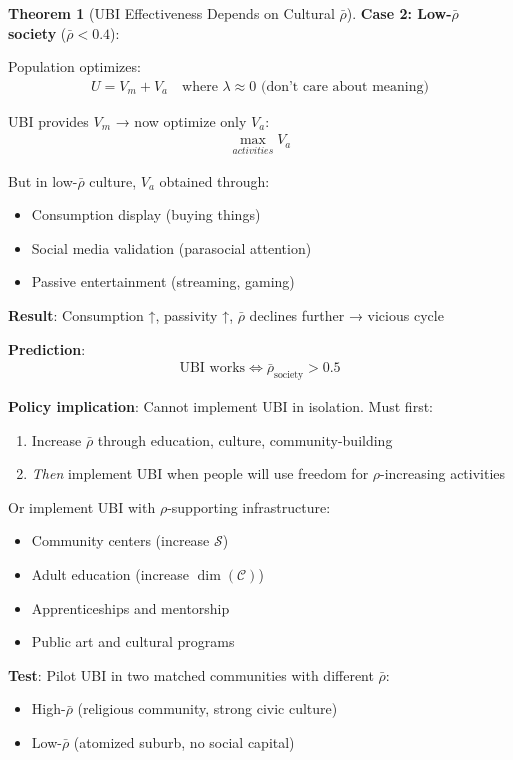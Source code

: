 \documentclass[11pt,a4paper]{article}
\theoremstyle{definition}
\newtheorem{theorem}{Theorem}[section]
\theoremstyle{remark}
\newcommand{\CC}{\mathcal{C}}
\begin{document}
\begin{small}
\begin{enumerate}
\begin{theorem}[UBI Effectiveness Depends on Cultural \(\bar{\rho}\)]
\textbf{Case 2: Low-\(\bar{\rho}\) society} (\(\bar{\rho} < 0.4\)):

Population optimizes:
\begin{align}
U = V_m + V_a \quad \text{where } \lambda \approx 0 \text{ (don't care about meaning)}
\end{align}

UBI provides \(V_m\) → now optimize only \(V_a\):
\begin{align}
\max_{activities} V_a
\end{align}

But in low-\(\bar{\rho}\) culture, \(V_a\) obtained through:
\begin{itemize}
    \item Consumption display (buying things)
    \item Social media validation (parasocial attention)
    \item Passive entertainment (streaming, gaming)
\end{itemize}

\textbf{Result}: Consumption ↑, passivity ↑, \(\bar{\rho}\) declines further → vicious cycle

\textbf{Prediction}:
\begin{align}
\text{UBI works} \iff \bar{\rho}_{\text{society}} > 0.5
\end{align}

\textbf{Policy implication}: Cannot implement UBI in isolation. Must first:
\begin{enumerate}
    \item Increase \(\bar{\rho}\) through education, culture, community-building
    \item \textit{Then} implement UBI when people will use freedom for \(\rho\)-increasing activities
\end{enumerate}

Or implement UBI with \(\rho\)-supporting infrastructure:
\begin{itemize}
    \item Community centers (increase \(\mathcal{S}\))
    \item Adult education (increase \(\dim(\CC)\))
    \item Apprenticeships and mentorship
    \item Public art and cultural programs
\end{itemize}

\textbf{Test}: Pilot UBI in two matched communities with different \(\bar{\rho}\):
\begin{itemize}
    \item High-\(\bar{\rho}\) (religious community, strong civic culture)
    \item Low-\(\bar{\rho}\) (atomized suburb, no social capital)
\end{itemize}


\end{theorem}
\end{enumerate}
\end{small}
\end{document}
